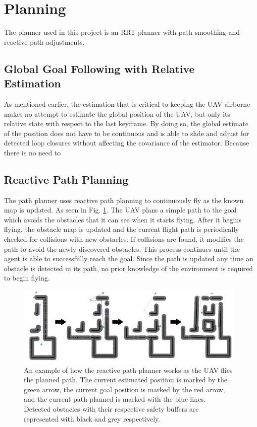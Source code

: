 \documentclass[letterpaper, 10 pt, conference]{ieeeconf}  %
\begin{document}
\section{Planning}\label{planning}

The planner used in this project is an RRT planner with path smoothing and reactive path adjustments.

\subsection{Global Goal Following with Relative Estimation}

As mentioned earlier, the estimation that is critical to keeping the UAV airborne makes no attempt to estimate the global position of the UAV, but only its relative state with respect to the last keyframe. By doing so, the global estimate of the position does not have to be continuous and is able to slide and adjust for detected loop closures without affecting the covariance of the estimator. Because there is no need to

\subsection{Reactive Path Planning}

The path planner uses reactive path planning to continuously fly as the known map is updated. As seen in Fig. \ref{fig:reactive_plan}. The UAV plans a simple path to the goal which avoids the obstacles that it can see when it starts flying. After it begins flying, the obstacle map is updated and the current flight path is periodically checked for collisions with new obstacles. If collisions are found, it modifies the path to avoid the newly discovered obstacles. This process continues until the agent is able to successfully reach the goal. Since the path is updated any time an obstacle is detected in its path, no prior knowledge of the environment is required to begin flying.

\begin{figure}
\centering
\includegraphics[width=1.0\linewidth]{adaptive_path_plan2.png}
\caption{An example of how the reactive path planner works as the UAV flies the planned path. The current estimated position is marked by the green arrow, the current goal position is marked by the red arrow, and the current path planned is marked with the blue lines. Detected obstacles with their respective safety buffers are represented with black and grey respectively.}
\label{fig:reactive_plan}
\end{figure}
\end{document}
